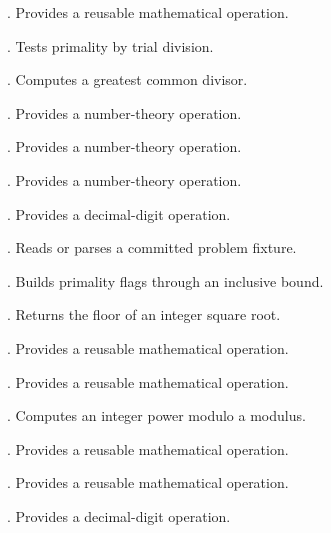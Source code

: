 \begin{description}
\item[\texttt{}] \texttt{\detokenize{( -- )}}. Provides a reusable mathematical operation.
\item[\texttt{}] \texttt{}. Tests primality by trial division.
\item[\texttt{}] \texttt{}. Computes a greatest common divisor.
\item[\texttt{}] \texttt{}. Provides a number-theory operation.
\item[\texttt{}] \texttt{}. Provides a number-theory operation.
\item[\texttt{}] \texttt{}. Provides a number-theory operation.
\item[\texttt{}] \texttt{}. Provides a decimal-digit operation.
\item[\texttt{}] \texttt{}. Reads or parses a committed problem fixture.
\item[\texttt{}] \texttt{}. Builds primality flags through an inclusive bound.
\item[\texttt{}] \texttt{}. Returns the floor of an integer square root.
\item[\texttt{}] \texttt{}. Provides a reusable mathematical operation.
\item[\texttt{}] \texttt{}. Provides a reusable mathematical operation.
\item[\texttt{}] \texttt{}. Computes an integer power modulo a modulus.
\item[\texttt{}] \texttt{}. Provides a reusable mathematical operation.
\item[\texttt{}] \texttt{}. Provides a reusable mathematical operation.
\item[\texttt{}] \texttt{}. Provides a decimal-digit operation.

\end{description}
